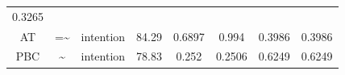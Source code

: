 \documentclass[]{article}
\theoremstyle{definition}
\theoremstyle{definition}
\theoremstyle{definition}
\theoremstyle{remark}
\begin{document}
\begin{longtable}[]{@{}cccccccc@{}}
\begin{minipage}[t]{0.11\columnwidth}
0.3265\strut
\end{minipage}\tabularnewline
\begin{minipage}[t]{0.11\columnwidth}\centering\strut
AT\strut
\end{minipage} & \begin{minipage}[t]{0.05\columnwidth}\centering\strut
=\textasciitilde{}\strut
\end{minipage} & \begin{minipage}[t]{0.12\columnwidth}\centering\strut
intention\strut
\end{minipage} & \begin{minipage}[t]{0.08\columnwidth}\centering\strut
84.29\strut
\end{minipage} & \begin{minipage}[t]{0.10\columnwidth}\centering\strut
0.6897\strut
\end{minipage} & \begin{minipage}[t]{0.10\columnwidth}\centering\strut
0.994\strut
\end{minipage} & \begin{minipage}[t]{0.11\columnwidth}\centering\strut
0.3986\strut
\end{minipage} & \begin{minipage}[t]{0.11\columnwidth}\centering\strut
0.3986\strut
\end{minipage}\tabularnewline
\begin{minipage}[t]{0.11\columnwidth}\centering\strut
PBC\strut
\end{minipage} & \begin{minipage}[t]{0.05\columnwidth}\centering\strut
\textasciitilde{}\strut
\end{minipage} & \begin{minipage}[t]{0.12\columnwidth}\centering\strut
intention\strut
\end{minipage} & \begin{minipage}[t]{0.08\columnwidth}\centering\strut
78.83\strut
\end{minipage} & \begin{minipage}[t]{0.10\columnwidth}\centering\strut
0.252\strut
\end{minipage} & \begin{minipage}[t]{0.10\columnwidth}\centering\strut
0.2506\strut
\end{minipage} & \begin{minipage}[t]{0.11\columnwidth}\centering\strut
0.6249\strut
\end{minipage} & \begin{minipage}[t]{0.11\columnwidth}\centering\strut
0.6249\strut
\end{minipage}\tabularnewline
\bottomrule
\end{longtable}
\end{document}
